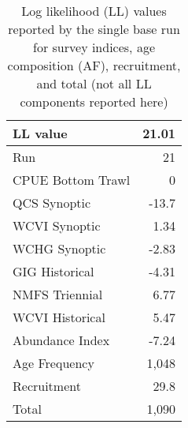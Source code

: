 \documentclass[11pt]{book}
\begin{document}
\setlength{\tabcolsep}{6pt}
\begin{table}[ht]
\centering
\caption{Log likelihood (LL) values reported by the single base run for survey indices, age composition (AF), recruitment, and total (not all LL components reported here)} 
\label{tab:pop.log.likes}
\begin{tabular}{lr}
  \\[-1.0ex] \hline
LL value & 21.01 \\ 
  \hline
Run & 21 \\ 
  CPUE Bottom Trawl & 0 \\ 
  QCS Synoptic & -13.7 \\ 
  WCVI Synoptic & 1.34 \\ 
  WCHG Synoptic & -2.83 \\ 
  GIG Historical & -4.31 \\ 
  NMFS Triennial & 6.77 \\ 
  WCVI Historical & 5.47 \\ 
  Abundance Index & -7.24 \\ 
  Age Frequency & 1,048 \\ 
  Recruitment & 29.8 \\ 
  Total & 1,090 \\ 
   \hline
\end{tabular}
\end{table}

%
%

%

\clearpage

\clearpage


\graphicspath{{C:/Users/haighr/Files/GFish/PSARC/PSARC_2020s/PSARC23/POP/Data/SS/POP2023/Run21/MCMC.21.01.v3a/english/}}
\end{document}
